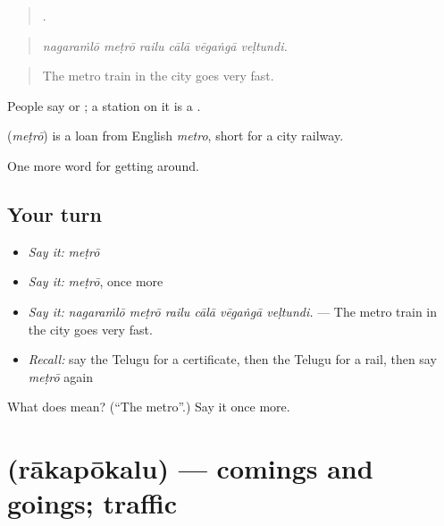 \begin{quote}
     .
\end{quote}

\begin{quote}
\emph{nagaraṁlō meṭrō railu cālā vēgaṅgā veḷtundi.}
\end{quote}

\begin{quote}
The metro train in the city goes very fast.
\end{quote}

People say  or  ; a station on it is a  .

\begin{cousinweb}
\textbf{} (\emph{meṭrō}) is a loan from English \emph{metro}, short for a city railway.
\end{cousinweb}

\begin{grammarlens}[title={What you've built}]
One more word for getting around.
\end{grammarlens}

\subsection*{Your turn}
\begin{itemize}
\raggedright
  \item \emph{Say it:} \emph{meṭrō}
  \item \emph{Say it:} \emph{meṭrō}, once more
  \item \emph{Say it:} \emph{nagaraṁlō meṭrō railu cālā vēgaṅgā veḷtundi.} — The metro train in the city goes very fast.
  \item \emph{Recall:} say the Telugu for a certificate, then the Telugu for a rail, then say \emph{meṭrō} again
\end{itemize}

\begin{tcolorbox}[breakable,colback=teal!4,colframe=teal!35!black,title={Before you move on}]
What does  mean? (\textquotedblleft{}The metro\textquotedblright{}.) Say it once more.
\end{tcolorbox}
\section[\texorpdfstring{\te{రాకపోకలు} (rākapōkalu)}{రాకపోకలు (rākapōkalu)}]{ (rākapōkalu) — comings and goings; traffic}

